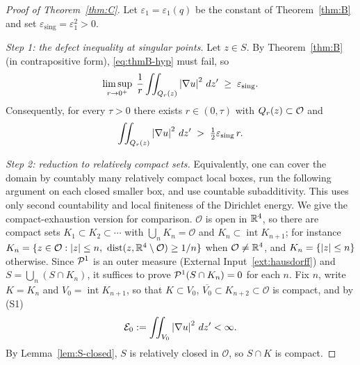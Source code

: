 \documentclass[11pt,reqno]{amsart}
\begin{document}
\begin{proof}[Proof of Theorem~\ref{thm:C}]
Let $\varepsilon_{1}=\varepsilon_{1}(q)$ be the constant of
Theorem~\ref{thm:B} and set $\varepsilon_{\mathrm{sing}}=\varepsilon_{1}^{2}>0$.

\emph{Step 1: the defect inequality at singular points.} Let $z\in S$. By
Theorem~\ref{thm:B} (in contrapositive form), \eqref{eq:thmB-hyp} must fail, so
\begin{equation}\label{eq:defect}
  \limsup_{r\to0^{+}}\;\frac1r\iint_{Q_{r}(z)}\left\lvert \nabla u \right\rvert^{2}\,dz'
  \;\ge\;\varepsilon_{\mathrm{sing}}.
\end{equation}
Consequently, for every $\tau>0$ there exists $r\in(0,\tau)$ with
$Q_{r}(z)\subset\mathcal{O}$ and
\begin{equation}\label{eq:defect-r}
  \iint_{Q_{r}(z)}\left\lvert \nabla u \right\rvert^{2}\,dz'\;>\;\tfrac12\varepsilon_{\mathrm{sing}}\,r .
\end{equation}

\emph{Step 2: reduction to relatively compact sets.}
Equivalently, one can cover the domain by countably many relatively
compact local boxes, run the following argument on each closed smaller
box, and use countable subadditivity. This uses only second countability
and local finiteness of the Dirichlet energy. We give the compact-exhaustion
version for comparison.
$\mathcal{O}$ is open in $\mathbb{R}^{4}$, so
there are compact sets $K_{1}\subset K_{2}\subset\cdots$ with
$\bigcup_{n}K_{n}=\mathcal{O}$ and $K_{n}\subset\operatorname{int}K_{n+1}$; for
instance $K_{n}=\{z\in\mathcal{O}:\abs{z}\le n,\ \dist(z,\R^{4}\setminus\mathcal{O})\ge1/n\}$
when $\mathcal{O}\ne\mathbb{R}^{4}$, and $K_{n}=\{\left\lvert z \right\rvert\le n\}$ otherwise. Since
$\mathcal{P}^{1}$ is an outer measure
(External Input~\ref{ext:hausdorff}) and $S=\bigcup_{n}(S\cap K_{n})$, it
suffices to prove $\mathcal{P}^{1}(S\cap K_{n})=0$ for each $n$. Fix $n$, write
$K=K_{n}$ and $V_{0}=\operatorname{int}K_{n+1}$, so that $K\subset V_{0}$,
$\overline{V_{0}}\subset K_{n+2}\subset\mathcal{O}$ is compact, and by (S1)
\begin{equation}\label{eq:finite-dirichlet}
  \mathcal{E}_{0}:=\iint_{V_{0}}\left\lvert \nabla u \right\rvert^{2}\,dz'<\infty .
\end{equation}
By Lemma~\ref{lem:S-closed}, $S$ is relatively closed in $\mathcal{O}$, so
$S\cap K$ is compact.


\end{proof}
\end{document}
